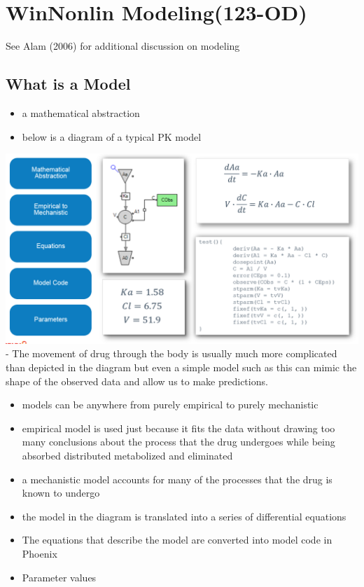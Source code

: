 \documentclass[
  letterpaper,
  DIV=11,
  numbers=noendperiod]{scrreprt}
\providecommand{\tightlist}{%
  \setlength{\itemsep}{0pt}\setlength{\parskip}{0pt}}\usepackage{longtable,booktabs,array}
\begin{document}
\hypertarget{winnonlin-modeling123-od}{%
\chapter{WinNonlin Modeling(123-OD)}\label{winnonlin-modeling123-od}}

See Alam (2006) for additional discussion on modeling

\hypertarget{what-is-a-model}{%
\section{What is a Model}\label{what-is-a-model}}

\begin{itemize}
\tightlist
\item
  a mathematical abstraction
\item
  below is a diagram of a typical PK model
\end{itemize}

\includegraphics{./img/model-1.png}- The movement of drug through the
body is usually much more complicated than depicted in the diagram but
even a simple model such as this can mimic the shape of the observed
data and allow us to make predictions.

\begin{itemize}
\tightlist
\item
  models can be anywhere from purely empirical to purely mechanistic\\
\item
  empirical model is used just because it fits the data without drawing
  too many conclusions about the process that the drug undergoes while
  being absorbed distributed metabolized and eliminated
\item
  a mechanistic model accounts for many of the processes that the drug
  is known to undergo
\item
  the model in the diagram is translated into a series of differential
  equations\\
\item
  The equations that describe the model are converted into model code in
  Phoenix
\item
  Parameter values
\end{itemize}
\end{document}
